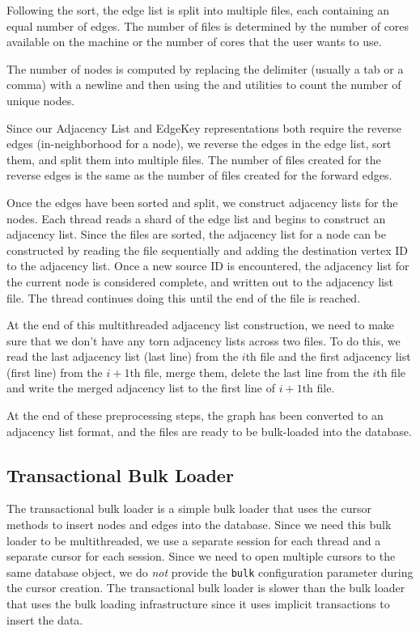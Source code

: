 Following the sort, the edge list is split into multiple files, each containing an equal number of edges.
The number of files is determined by the number of cores available on the machine or the number of cores that the user wants to use.

The number of nodes is computed by replacing the delimiter (usually a tab or a comma) with a newline and then using the  and  utilities to count the number of unique nodes.

Since our Adjacency List and EdgeKey representations both require the reverse edges (in-neighborhood for a node), we reverse the edges in the edge list, sort them, and split them into multiple files.
The number of files created for the reverse edges is the same as the number of files created for the forward edges.

Once the edges have been sorted and split, we construct adjacency lists for the nodes.
Each thread reads a shard of the edge list and begins to construct an adjacency list. 
Since the files are sorted, the adjacency list for a node can be constructed by reading the file sequentially and adding the destination vertex ID to the adjacency list.
Once a new source ID is encountered, the adjacency list for the current node is considered complete, and written out to the adjacency list file. The thread continues doing this until the end of the file is reached.

At the end of this multithreaded adjacency list construction, we need to make sure that we don't have any torn adjacency lists across two files.
To do this, we read the last adjacency list (last line) from the $i$th file and the first adjacency list (first line) from the $i+1$th file, merge them, delete the last line from the $i$th file and write the merged adjacency list to the first line of $i+1$th file.

At the end of these preprocessing steps, the graph has been converted to an adjacency list format, and the files are ready to be bulk-loaded into the database.

\subsection{Transactional Bulk Loader}
The transactional bulk loader is a simple bulk loader that uses the \wt{} cursor methods to insert nodes and edges into the database.
Since we need this bulk loader to be multithreaded, we use a separate session for each thread and a separate cursor for each session.
Since we need to open multiple cursors to the same database object, we do \emph{not} provide the \texttt{bulk} configuration parameter during the cursor creation.
The transactional bulk loader is slower than the bulk loader that uses the \wt{} bulk loading infrastructure since it uses implicit transactions to insert the data.

